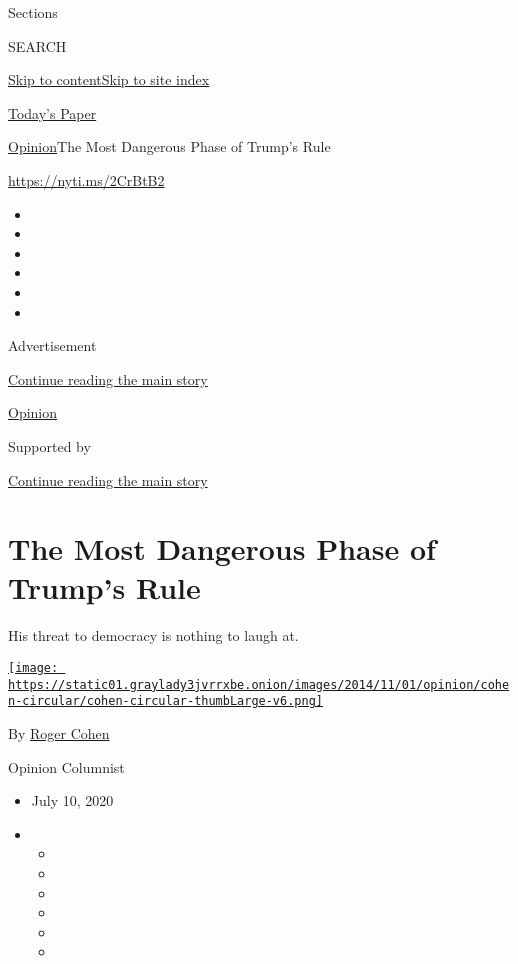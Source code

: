 Sections

SEARCH

\protect\hyperlink{site-content}{Skip to
content}\protect\hyperlink{site-index}{Skip to site index}

\href{https://myaccount.nytimes3xbfgragh.onion/auth/login?response_type=cookie\&client_id=vi}{}

\href{https://www.nytimes3xbfgragh.onion/section/todayspaper}{Today's
Paper}

\href{/section/opinion}{Opinion}\textbar{}The Most Dangerous Phase of
Trump's Rule

\url{https://nyti.ms/2CrBtB2}

\begin{itemize}
\item
\item
\item
\item
\item
\item
\end{itemize}

Advertisement

\protect\hyperlink{after-top}{Continue reading the main story}

\href{/section/opinion}{Opinion}

Supported by

\protect\hyperlink{after-sponsor}{Continue reading the main story}

\hypertarget{the-most-dangerous-phase-of-trumps-rule}{%
\section{The Most Dangerous Phase of Trump's
Rule}\label{the-most-dangerous-phase-of-trumps-rule}}

His threat to democracy is nothing to laugh at.

\href{https://www.nytimes3xbfgragh.onion/by/roger-cohen}{\texttt{[image: https://static01.graylady3jvrrxbe.onion/images/2014/11/01/opinion/cohen-circular/cohen-circular-thumbLarge-v6.png]}}

By \href{https://www.nytimes3xbfgragh.onion/by/roger-cohen}{Roger Cohen}

Opinion Columnist

\begin{itemize}
\item
  July 10, 2020
\item
  \begin{itemize}
  \item
  \item
  \item
  \item
  \item
  \item
  \end{itemize}
\end{itemize}


